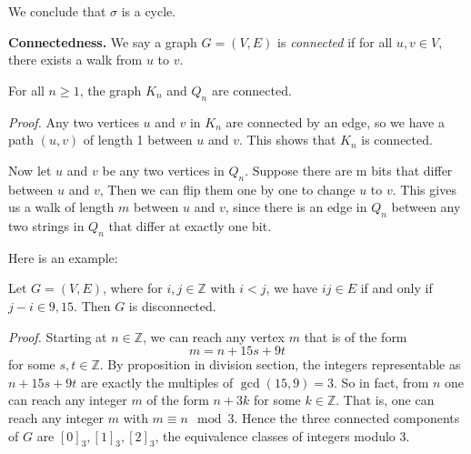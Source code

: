 \documentclass{tufte-handout}
\begin{document}
We conclude that \( \sigma \) is a cycle. \qedsymbol

\textbf{Connectedness.} We say a graph \( G = (V,E) \) is \textit{connected} if for all \( u,v \in V \),
there exists a walk from \( u \) to \( v \).

\begin{Proposition}
    For all \( n \geq 1 \), the graph \( K_n \) and \( Q_n \) are connected.
\end{Proposition}

\textit{Proof.} Any two vertices \( u \) and \( v \) in \( K_n \) are connected by an edge, so
we have a path \( (u,v) \) of length 1 between \( u \) and \( v \). This shows that \( K_n \)
is connected.

Now let \( u \) and \( v \) be any two vertices in \( Q_n \). Suppose there are m 
bits that differ between \( u \) and \( v \), Then we can flip them one by one to change \( u \) to \( v \).
This gives us a walk of length \( m \) between \( u \) and \( v \), since there is an
edge in \( Q_n \) between any two strings in \( Q_n \) that differ at exactly one bit. \qedsymbol

Here is an example:
\begin{Example}
    Let \( G = (V,E) \), where for \( i,j \in \mathbb{Z} \) with \( i<j \), we have \( ij \in E \)
    if and only if \( j-i \in {9,15} \). Then \( G \) is disconnected.
\end{Example}
\textit{Proof.}
Starting at \( n \in \mathbb{Z} \), we can reach any vertex \( m \) that is of the form \[m=n+15s+9t\]
for some \( s,t \in \mathbb{Z} \). By proposition in division section, the integers representable as
\( n+15s+9t \) are exactly the multiples of \( \gcd(15,9) = 3 \). So in fact, from \( n \) one can reach any integer \( m \)
of the form \( n+3k \) for some \( k \in \mathbb{Z} \). That is, one can reach any integer \( m \) with
\( m \equiv n \mod 3 \). Hence the three connected components of \( G \) are \( [0]_3, [1]_3,[2]_3\),
the equivalence classes of integers modulo 3. \qedsymbol
\end{document}
